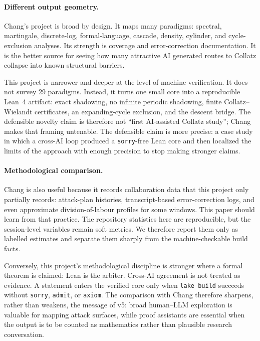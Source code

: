 \documentclass[11pt,a4paper]{article}
\theoremstyle{definition}
\begin{document}
\paragraph{Different output geometry.}
Chang's project is broad by design. It maps many paradigms: spectral,
martingale, discrete-log, formal-language, cascade, density, cylinder, and
cycle-exclusion analyses. Its strength is coverage and error-correction
documentation. It is the better source for seeing how many attractive AI
generated routes to Collatz collapse into known structural barriers.

This project is narrower and deeper at the level of machine verification.
It does not survey 29 paradigms. Instead, it turns one small core into a
reproducible Lean~4 artifact: exact shadowing, no infinite periodic
shadowing, finite Collatz--Wielandt certificates, an expanding-cycle
exclusion, and the descent bridge. The defensible novelty claim is therefore
not ``first AI-assisted Collatz study''; Chang makes that framing untenable.
The defensible claim is more precise: a case study in which a cross-AI loop
produced a \texttt{sorry}-free Lean core and then localized the limits of
the approach with enough precision to stop making stronger claims.

\paragraph{Methodological comparison.}
Chang is also useful because it records collaboration data that this project
only partially records: attack-plan histories, transcript-based
error-correction logs, and even approximate division-of-labour profiles for
some windows. This paper should learn from that practice. The repository
statistics here are reproducible, but the session-level variables remain
soft metrics. We therefore report them only as labelled estimates and
separate them sharply from the machine-checkable build facts.

Conversely, this project's methodological discipline is stronger where a
formal theorem is claimed: Lean is the arbiter. Cross-AI agreement is not
treated as evidence. A statement enters the verified core only when
\texttt{lake build} succeeds without \texttt{sorry}, \texttt{admit}, or
\texttt{axiom}. The comparison with Chang therefore sharpens, rather than
weakens, the message of v5: broad human--LLM exploration is valuable for
mapping attack surfaces, while proof assistants are essential when the
output is to be counted as mathematics rather than plausible research
conversation.
\end{document}
